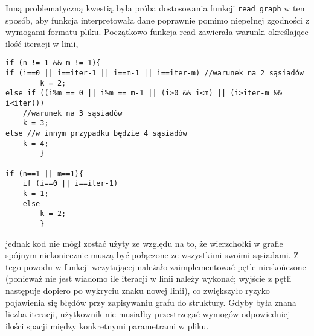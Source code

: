 \documentclass[]{article}
\begin{document}
Inną problematyczną kwestią była próba dostosowania funkcji \texttt{read\_graph} w ten sposób, aby funkcja interpretowała dane poprawnie pomimo niepełnej zgodności z wymogami formatu pliku. Początkowo funkcja read zawierała warunki określające ilość iteracji w linii,
\begin{verbatim}
if (n != 1 && m != 1){
if (i==0 || i==iter-1 || i==m-1 || i==iter-m) //warunek na 2 sąsiadów
        k = 2;
else if ((i%m == 0 || i%m == m-1 || (i>0 && i<m) || (i>iter-m && i<iter))) 
    //warunek na 3 sąsiadów
    k = 3;
else //w innym przypadku będzie 4 sąsiadów
    k = 4;
		}

if (n==1 || m==1){
	if (i==0 || i==iter-1)
    k = 1;
	else
		k = 2;
		}
		\end{verbatim}
		jednak kod nie mógł zostać użyty ze względu na to, że wierzchołki w grafie spójnym niekoniecznie muszą być połączone ze wszystkimi swoimi sąsiadami. Z tego powodu w funkcji wczytującej należało zaimplementować pętle nieskończone (ponieważ nie jest wiadomo ile iteracji w linii należy wykonać; wyjście z pętli następuje dopiero po wykryciu znaku nowej linii), co zwiększyło ryzyko pojawienia się błędów przy zapisywaniu grafu do struktury. Gdyby była znana liczba iteracji, użytkownik nie musiałby przestrzegać wymogów odpowiedniej ilości spacji między konkretnymi parametrami w pliku.
\end{document}
